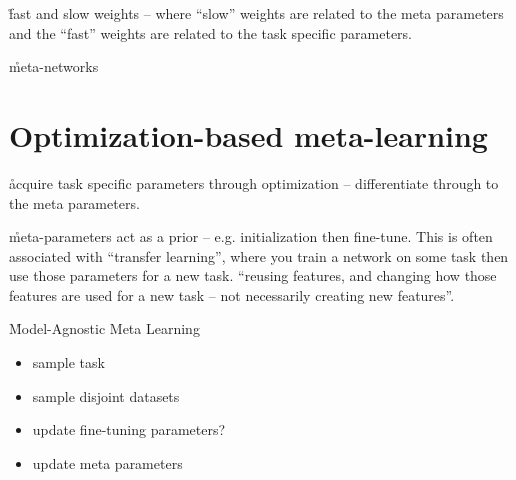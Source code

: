 \r{fast and slow weights -- where ``slow'' weights are related to the meta parameters and the ``fast'' weights are related to the task specific parameters.}

\r{meta-networks \cite{munkhdalai2017meta}}

\section{Optimization-based meta-learning}

\r{acquire task specific parameters through optimization -- differentiate through to the meta parameters.}

\r{meta-parameters act as a prior -- e.g. initialization then fine-tune. This is often associated with ``transfer learning'', where you train a network on some task then use those parameters for a new task. ``reusing features, and changing how those features are used for a new task -- not necessarily creating new features''.}


\r{Model-Agnostic Meta Learning }



\begin{itemize}[noitemsep,topsep=0pt]
	\item sample task
	\item sample disjoint datasets
	\item update fine-tuning parameters?
	\item update meta parameters
\end{itemize}




